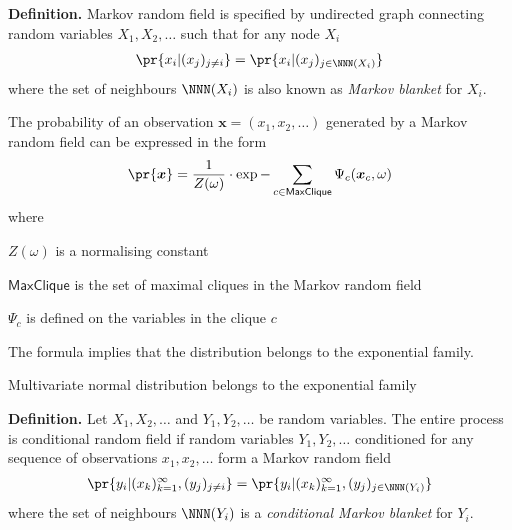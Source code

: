\documentclass[landscape,footrule]{foils}
\renewcommand{\vec}[1]{\boldsymbol{#1}}
\begin{document}

\textbf{Definition.}
Markov random field is specified by undirected graph connecting random variables $X_1,X_2,\ldots$ such that for any node $X_i$ 
\begin{align*}
\pr{x_i|(x_j)_{j\neq i}}=\pr{x_i| (x_j)_{j\in\NNN(X_i)} }
\end{align*}
where the set of neighbours $\NNN(X_i)$ is also known as \emph{Markov blanket} for $X_i$. 



The probability of an observation $\vec{x}=(x_1,x_2,\ldots)$ generated by a Markov random field can be expressed in the form 
\begin{align*}
\pr{\vec{x}}=\frac{1}{Z(\omega)}\cdot\exp{-\sum_{c\in\textsf{MaxClique}}\Psi_c(\vec{x}_c,\omega)} 
\end{align*}  
where
\begin{triangles}
\item $Z(\omega)$ is a normalising constant
\item $\textsf{MaxClique}$ is the set of maximal cliques in the Markov random field
\item $\Psi_c$ is defined on the variables in the clique $c$ 
\end{triangles}
\vspace*{2ex}

The formula implies that the distribution belongs to the exponential family.

\begin{triangles}
\item Multivariate normal distribution belongs to the exponential family
\end{triangles}




\textbf{Definition.}
Let $X_1,X_2,\ldots$ and $Y_1,Y_2,\ldots$ be random variables. The entire process is conditional random field if random variables $Y_1,Y_2,\ldots$ conditioned for any sequence of observations $x_1,x_2,\ldots$ form a Markov random field
\begin{align*}
\pr{y_i|(x_k)_{k=1}^\infty, (y_j)_{j\neq i}}=\pr{y_i|(x_k)_{k=1}^\infty, (y_j)_{j\in\NNN(Y_i)} }
\end{align*}
where the set of neighbours $\NNN(Y_i)$ is a \emph{conditional Markov blanket} for $Y_i$. 
\end{document}
